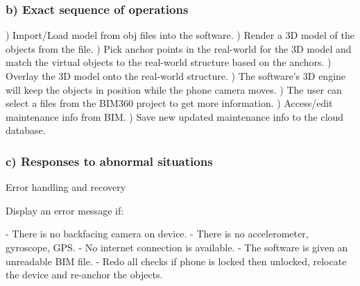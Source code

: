 \documentclass[onecolumn, draftclsnofoot,10pt, compsoc]{IEEEtran}
\begin{document}
        \subsubsection*{b) Exact sequence of operations}
            \hangindent=10mm) Import/Load model from obj files into the software. ) Render a 3D model of the objects from the file. ) Pick anchor points in the real-world for the 3D model and match the virtual objects to the real-world structure based on the anchors. ) Overlay the 3D model onto the real-world structure. ) The software's 3D engine will keep the objects in position while the phone camera moves. ) The user can select a files from the BIM360 project to get more information. ) Access/edit maintenance info from BIM. ) Save new updated maintenance info to the cloud database. \par
        \subsubsection*{c) Responses to abnormal situations}
            \hangindent=10mm\noindent
            Error handling and recovery \par
            \hangindent=15mm\noindent
            Display an error message if: \par
            \hangindent=20mm\noindent
                    - There is no backfacing camera on device. \newline
                    - There is no accelerometer, gyroscope, GPS. \newline
                    - No internet connection is available. \newline
                    - The software is given an unreadable BIM file. \newline
                    - Redo all checks if phone is locked then unlocked, relocate the device and re-anchor the objects. \newline
             \par
\end{document}
